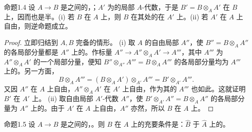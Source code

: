 \begin{SGAresult}{命题}{1.4}
设 $A\to B$ 是之间的，；$A'$ 为的局部 $A$-代数，于是 $B'=B\otimes_A A'$ 在 $B$ 上，因而也是半。(i) 若 $B$ 在 $A$ 上，则 $B$ 在其处的在 $A'$ 上。(ii) 若 $A'$ 在 $A$ 上自由，则逆命题成立。
\end{SGAresult}
\begin{proof}
立即归结到 $A,B$ 完备的情形。
(i) 取 $A$ 的自由局部 $A''$，使 $B''=B\otimes_A A''$ 的各局部分量都是 $A''$ 上的。作标量 $A''\to A''\otimes_A A'\to A'''$，其中 $A'''$ 为 $A''\otimes_A A'$ 的一个局部分量，便知 $B''\otimes_{A''}A'''=B\otimes_A A'''$ 的各局部分量均为 $A'''$ 上的。另一方面，
\[B\otimes_A A'''=(B\otimes_A A')\otimes_{A'}A'''=B'\otimes_{A'}A'''.\]
又因 $A''$ 在 $A$ 上自由，$A''\otimes_A A'$ 在 $A'$ 上自由，作为其的 $A'''$ 也如此。这就证明 $B'$ 在 $A'$ 上。
(ii) 取自由局部 $A'$-代数 $A''$，使 $B'\otimes_{A'}A''=B\otimes_A A''$ 的各局部分量为 $A''$ 上的。由于 $A'$ 在 $A$ 上自由，$A''$ 亦然，所以 $B$ 在 $A$ 上。
\end{proof}
\begin{SGAresult}{命题}{1.5}
设 $A\to B$ 是之间的，。则 $B$ 在 $A$ 上的充要条件是：$\widehat B$ 于 $\widehat A$ 上的。
\end{SGAresult}
